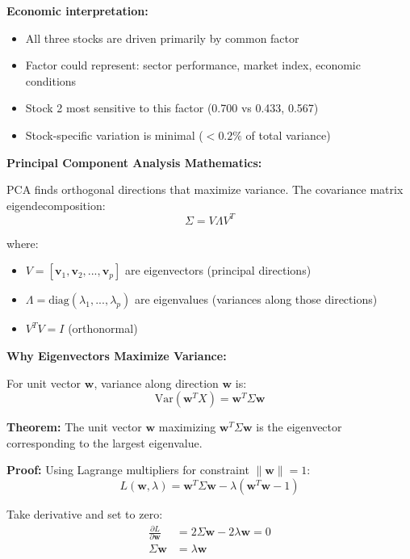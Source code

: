 \documentclass[12pt]{article}
\begin{document}
\begin{solution}
\textbf{Economic interpretation:}
\begin{itemize}
    \item All three stocks are driven primarily by common factor
    \item Factor could represent: sector performance, market index, economic conditions
    \item Stock 2 most sensitive to this factor (0.700 vs 0.433, 0.567)
    \item Stock-specific variation is minimal ($< 0.2\%$ of total variance)
\end{itemize}

\end{solution}

\begin{explanation}

\textbf{Principal Component Analysis Mathematics:}

PCA finds orthogonal directions that maximize variance. The covariance matrix eigendecomposition:
\[
\Sigma = V \Lambda V^T
\]

where:
\begin{itemize}
    \item $V = [\mathbf{v}_1, \mathbf{v}_2, ..., \mathbf{v}_p]$ are eigenvectors (principal directions)
    \item $\Lambda = \text{diag}(\lambda_1, ..., \lambda_p)$ are eigenvalues (variances along those directions)
    \item $V^TV = I$ (orthonormal)
\end{itemize}

\textbf{Why Eigenvectors Maximize Variance:}

For unit vector $\mathbf{w}$, variance along direction $\mathbf{w}$ is:
\[
\text{Var}(\mathbf{w}^T X) = \mathbf{w}^T \Sigma \mathbf{w}
\]

\textbf{Theorem:} The unit vector $\mathbf{w}$ maximizing $\mathbf{w}^T\Sigma\mathbf{w}$ is the eigenvector corresponding to the largest eigenvalue.

\textbf{Proof:} Using Lagrange multipliers for constraint $\|\mathbf{w}\| = 1$:
\[
L(\mathbf{w}, \lambda) = \mathbf{w}^T\Sigma\mathbf{w} - \lambda(\mathbf{w}^T\mathbf{w} - 1)
\]

Take derivative and set to zero:
\begin{align*}
\frac{\partial L}{\partial \mathbf{w}} &= 2\Sigma\mathbf{w} - 2\lambda\mathbf{w} = 0 \\
\Sigma\mathbf{w} &= \lambda\mathbf{w}
\end{align*}


\end{explanation}
\end{document}
